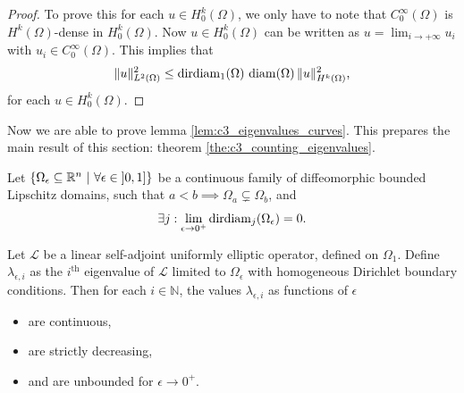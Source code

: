 \begin{proof}
  To prove this for each $u \in H_0^k(\Omega)$, we only have to note that
  $C^\infty_0(\Omega)$ is $H^k(\Omega)$-dense in $H^k_0(\Omega)$. Now $u \in H_0^k(\Omega)$ can be written as $u = \lim_{i \to +\infty} u_i$ with $u_i \in C^\infty_0(\Omega)$. This implies that
  $$\|u\|_{L^2(\Omega)}^2 \leq \operatorname{dirdiam}_1(\Omega) \, \operatorname{diam}(\Omega) \, \| u \|^2_{H^k(\Omega)}\text{,}$$
  for each $u \in H_0^k(\Omega)$.
\end{proof}

Now we are able to prove lemma \ref{lem:c3_eigenvalues_curves}. This prepares the main result of this section: theorem \ref{the:c3_counting_eigenvalues}.

\begin{lemma}\label{lem:c3_eigenvalues_curves}
  Let $\left\{\Omega_\epsilon \subseteq \RR^n \ | \ \forall \epsilon \in \left]0, 1\right]\right\}$ be a continuous family of diffeomorphic bounded Lipschitz domains, such that $ a < b \implies \Omega_a \subsetneq \Omega_b $, and
  $$
    \exists j : \lim_{\epsilon \to 0^{+}} \operatorname{dirdiam}_j(\Omega_\epsilon) = 0\text{.}
  $$

  Let $\mathcal{L}$ be a linear self-adjoint uniformly elliptic operator, defined on $\Omega_1$. Define $\lambda_{\epsilon,i}$ as the $i^\text{th}$ eigenvalue of $\mathcal{L}$ limited to $\Omega_\epsilon$ with homogeneous Dirichlet boundary conditions. Then for each $i \in \mathbb{N}$, the values $\lambda_{\epsilon,i}$ as functions of $\epsilon$
  \begin{itemize}
    \item are continuous,
    \item are strictly decreasing,
    \item and are unbounded for $\epsilon \to 0^{+}$.
  \end{itemize}
\end{lemma}
